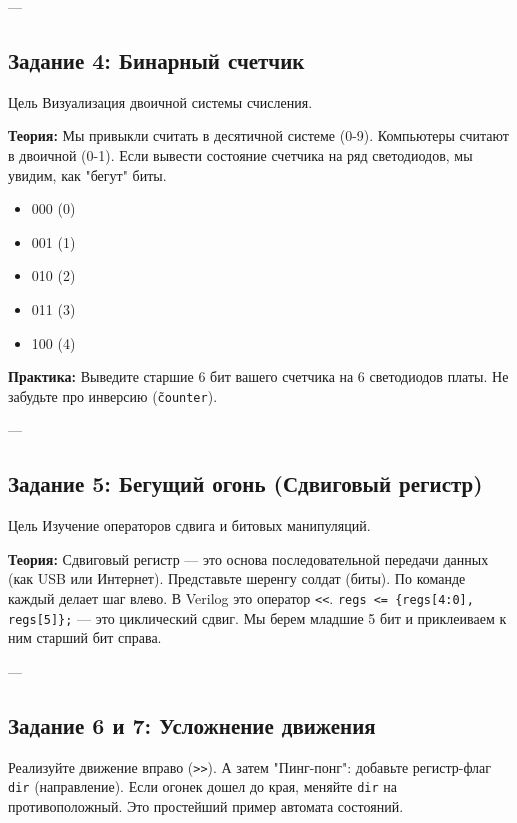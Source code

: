 \documentclass[12pt, a4paper]{article}
\begin{document}
---

\subsection{Задание 4: Бинарный счетчик}
\begin{taskbox}{Цель}
Визуализация двоичной системы счисления.
\end{taskbox}

\textbf{Теория:}
Мы привыкли считать в десятичной системе (0-9). Компьютеры считают в двоичной (0-1).
Если вывести состояние счетчика на ряд светодиодов, мы увидим, как "бегут" биты.
\begin{itemize}
    \item 000 (0)
    \item 001 (1)
    \item 010 (2)
    \item 011 (3)
    \item 100 (4)
\end{itemize}

\textbf{Практика:} Выведите старшие 6 бит вашего счетчика на 6 светодиодов платы. Не забудьте про инверсию (\texttt{\~counter}).

---

\subsection{Задание 5: Бегущий огонь (Сдвиговый регистр)}
\begin{taskbox}{Цель}
Изучение операторов сдвига и битовых манипуляций.
\end{taskbox}

\textbf{Теория:}
Сдвиговый регистр — это основа последовательной передачи данных (как USB или Интернет). Представьте шеренгу солдат (биты). По команде каждый делает шаг влево.
В Verilog это оператор \texttt{<<}.
\texttt{regs <= \{regs[4:0], regs[5]\};} — это циклический сдвиг. Мы берем младшие 5 бит и приклеиваем к ним старший бит справа.

---

\subsection{Задание 6 и 7: Усложнение движения}
Реализуйте движение вправо (\texttt{>>}).
А затем "Пинг-понг": добавьте регистр-флаг \texttt{dir} (направление). Если огонек дошел до края, меняйте \texttt{dir} на противоположный. Это простейший пример автомата состояний.
\end{document}
